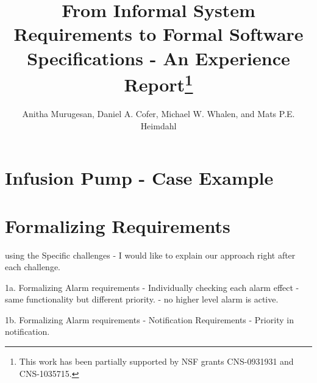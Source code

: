 \documentclass{llncs}
\begin{document}
\newcommand{\mcdc}{}%
\newcommand{\mike}[1]{\textcolor{red}{Mike: #1}}
\newcommand{\anitha}[1]{\textcolor{red}{#1}}
\newcommand{\oksana}[1]{\textcolor{magenta}{Oksana: #1}}
\newcommand{\sjp}[1]{\textcolor{blue}{#1}}
\newcommand{\nsr}[1]{\textcolor{blue}{#1}}
\sloppypar


\title{From Informal System Requirements to Formal Software Specifications  - An Experience Report\thanks{This work has been partially supported by NSF grants CNS-0931931 and CNS-1035715.}}

\author{Anitha Murugesan, Daniel A. Cofer, Michael W. Whalen, and Mats P.E. Heimdahl}

\maketitle

\begin{abstract}

\end{abstract}








%


\iffalse
\section{Infusion Pump - Case Example}
\section{Formalizing Requirements}

using the Specific challenges - I would like to explain our approach right after each challenge.

1a. Formalizing Alarm requirements - Individually checking each alarm effect - same functionality but different priority. - no higher level alarm is active.

\vspace{2mm}

1b. Formalizing Alarm requirements - Notification Requirements - Priority in notification.

\vspace{2mm}
\end{document}
